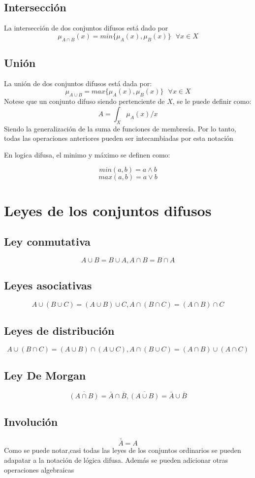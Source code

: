 \documentclass{article}
\begin{document}
\subsection{Intersección}
La intersección de dos conjuntos difusos está dado por 
$$\mu_{A\cap B}(x)= min\{\mu_A(x),\mu_B(x)\} \text{  }\forall x \in X$$
\subsection{Unión}
La unión de dos conjuntos difusos está dada por:
$$\mu_{A\cup B}=max\{\mu_A(x),\mu_B(x)\} \text{  }\forall x \in X$$
Notese que un conjunto difuso siendo  pertenciente de $X$, se le puede definir como:
$$A=\int_X \mu_A(x)/x$$
Siendo la generalización de la suma de funciones de membresía.
Por lo tanto, todas las operaciones anteriores pueden ser intecambiadas por esta notación

En logica difusa, el minimo y máximo se definen como:

$$min(a,b)= a\land b$$
$$max(a,b)=a \lor b$$
\section{Leyes de los conjuntos difusos}
\subsection{Ley conmutativa}
$$A \cup B =B \cup A , A \cap B = B \cap A$$
\subsection{Leyes asociativas}
$$A \cup (B \cup C )= (A \cup B) \cup C , A \cap (B \cap C )= (A \cap B) \cap C $$
\subsection{Leyes de distribución}
$$A \cup (B \cap C)= (A \cup B) \cap (A \cup C),A \cap (B \cup C)= (A \cap B) \cup (A \cap C)$$
\subsection{Ley De Morgan}
$$\overline{(A \cap B)}= \bar{A} \cap \bar{B}, \overline{(A \cup B)}= \bar{A} \cup \bar{B} $$
\subsection{Involución}
$$\bar{\bar{A}}=A$$
Como se puede notar,casi todas las leyes de los conjuntos ordinarios se pueden adapatar a la notación de lógica difusa.
Además se pueden adicionar otras operaciones algebraicas
\end{document}
